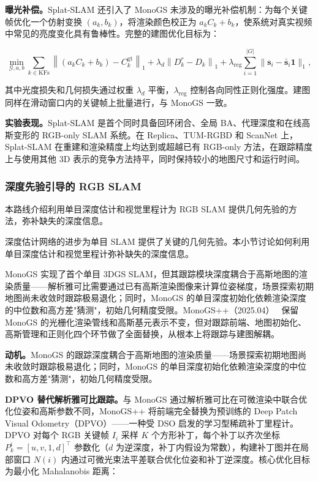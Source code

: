 \textbf{曝光补偿。}Splat-SLAM 还引入了 MonoGS 未涉及的曝光补偿机制：为每个关键帧优化一个仿射变换 $(a_k, b_k)$，将渲染颜色校正为 $a_k C_k + b_k$，使系统对真实视频中常见的亮度变化具有鲁棒性。完整的建图优化目标为：

\begin{equation*}
\min_{\mathcal{G}, a, b} \sum_{k \in \mathrm{KFs}} \left\| (a_k C_k + b_k) - C^{\mathrm{gt}}_k \right\|_1 + \lambda_d \left\| D^r_k - D_k \right\|_1 + \lambda_{\mathrm{reg}} \sum_{i=1}^{|G|} \| \mathbf{s}_i - \bar{\mathbf{s}}_i \mathbf{1} \|_1,
\end{equation*}

其中光度损失和几何损失通过权重 $\lambda_d$ 平衡，$\lambda_{\mathrm{reg}}$ 控制各向同性正则化强度。建图同样在滑动窗口内的关键帧上批量进行，与 MonoGS 一致。

\textbf{实验表现。}Splat-SLAM 是首个同时具备回环闭合、全局 BA、代理深度和在线高斯变形的 RGB-only SLAM 系统。在 Replica、TUM-RGBD 和 ScanNet 上，Splat-SLAM 在重建和渲染精度上均达到或超越已有 RGB-only 方法，在跟踪精度上与使用其他 3D 表示的竞争方法持平，同时保持较小的地图尺寸和运行时间。

\subsubsection{深度先验引导的 RGB SLAM}

本路线介绍利用单目深度估计和视觉里程计为 RGB SLAM 提供几何先验的方法，弥补缺失的深度信息。

深度估计网络的进步为单目 SLAM 提供了关键的几何先验。本小节讨论如何利用单目深度估计和视觉里程计弥补缺失的深度信息。

MonoGS 实现了首个单目 3DGS SLAM，但其跟踪模块深度耦合于高斯地图的渲染质量——解析雅可比需要通过已有高斯渲染图像来计算位姿梯度，场景探索初期地图尚未收敛时跟踪极易退化；同时，MonoGS 的单目深度初始化依赖渲染深度的中位数和高方差"猜测"，初始几何精度受限。MonoGS++（2025.04）~\cite{2504_02437} 保留 MonoGS 的光栅化渲染管线和高斯基元表示不变，但对跟踪前端、地图初始化、高斯管理和正则化四个环节做了全面替换，从根本上将跟踪与建图解耦。

\textbf{动机。}MonoGS 的跟踪深度耦合于高斯地图的渲染质量——场景探索初期地图尚未收敛时跟踪极易退化；同时，MonoGS 的单目深度初始化依赖渲染深度的中位数和高方差"猜测"，初始几何精度受限。

\textbf{DPVO 替代解析雅可比跟踪。}与 MonoGS 通过解析雅可比在可微渲染中联合优化位姿和高斯参数不同，MonoGS++ 将前端完全替换为预训练的 Deep Patch Visual Odometry（DPVO）——一种受 DSO 启发的学习型稀疏补丁里程计。DPVO 对每个 RGB 关键帧 $I_i$ 采样 $K$ 个方形补丁，每个补丁以齐次坐标 $P_k^i = [u, v, 1, d]^\top$ 参数化（$d$ 为逆深度，补丁内假设为常数），构建补丁图并在局部窗口 $N(i)$ 内通过可微光束法平差联合优化位姿和补丁逆深度。核心优化目标为最小化 Mahalanobis 距离：

